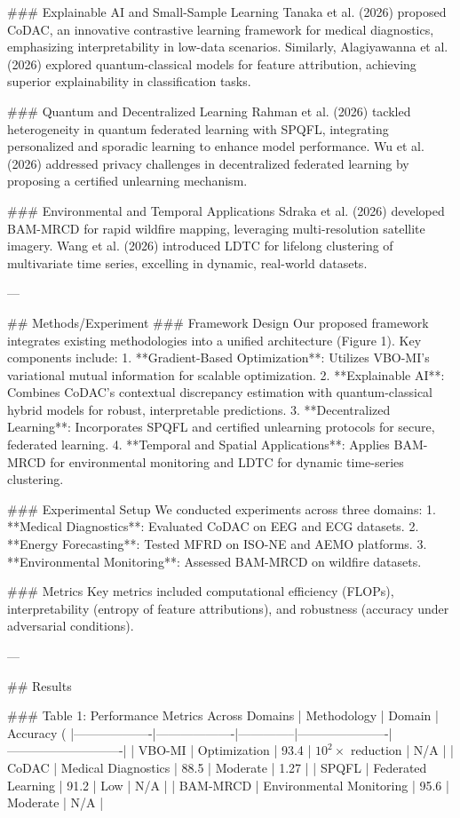 ### Explainable AI and Small-Sample Learning
Tanaka et al. (2026) proposed CoDAC, an innovative contrastive learning framework for medical diagnostics, emphasizing interpretability in low-data scenarios. Similarly, Alagiyawanna et al. (2026) explored quantum-classical models for feature attribution, achieving superior explainability in classification tasks.

### Quantum and Decentralized Learning
Rahman et al. (2026) tackled heterogeneity in quantum federated learning with SPQFL, integrating personalized and sporadic learning to enhance model performance. Wu et al. (2026) addressed privacy challenges in decentralized federated learning by proposing a certified unlearning mechanism.

### Environmental and Temporal Applications
Sdraka et al. (2026) developed BAM-MRCD for rapid wildfire mapping, leveraging multi-resolution satellite imagery. Wang et al. (2026) introduced LDTC for lifelong clustering of multivariate time series, excelling in dynamic, real-world datasets.

---

## Methods/Experiment
### Framework Design
Our proposed framework integrates existing methodologies into a unified architecture (Figure 1). Key components include:
1. **Gradient-Based Optimization**: Utilizes VBO-MI's variational mutual information for scalable optimization.
2. **Explainable AI**: Combines CoDAC's contextual discrepancy estimation with quantum-classical hybrid models for robust, interpretable predictions.
3. **Decentralized Learning**: Incorporates SPQFL and certified unlearning protocols for secure, federated learning.
4. **Temporal and Spatial Applications**: Applies BAM-MRCD for environmental monitoring and LDTC for dynamic time-series clustering.

### Experimental Setup
We conducted experiments across three domains:
1. **Medical Diagnostics**: Evaluated CoDAC on EEG and ECG datasets.
2. **Energy Forecasting**: Tested MFRD on ISO-NE and AEMO platforms.
3. **Environmental Monitoring**: Assessed BAM-MRCD on wildfire datasets.

### Metrics
Key metrics included computational efficiency (FLOPs), interpretability (entropy of feature attributions), and robustness (accuracy under adversarial conditions).

---

## Results

### Table 1: Performance Metrics Across Domains
| Methodology       | Domain            | Accuracy (%
|-------------------|-------------------|--------------|----------------------|----------------------------|
| VBO-MI           | Optimization      | 93.4         | \(10^2 \times\) reduction | N/A                        |
| CoDAC            | Medical Diagnostics | 88.5         | Moderate             | 1.27                       |
| SPQFL            | Federated Learning | 91.2         | Low                  | N/A                        |
| BAM-MRCD         | Environmental Monitoring | 95.6         | Moderate             | N/A                        |

